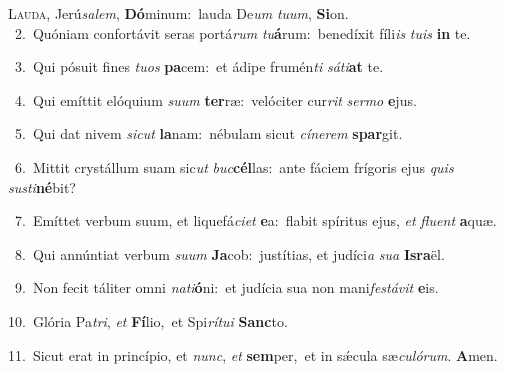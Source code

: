 \lettrine{\initial\textcolor{\initialcolor}{L}}{auda,} Jerú\-\textit{sa}\-\textit{lem}, \textbf{Dó}\-minum:~\star lauda De\textit{um} \textit{tu}\-\textit{um}, \textbf{Si}\-on.\\
{\numbfont\textcolor{\numbcolor}{~2.}}~Quóniam confortávit seras portá\textit{rum} \textit{tu}\-\textbf{á}rum:~\star benedíxit fíli\textit{is} \textit{tu}\-\textit{is} \textbf{in} te.\par
{\numbfont\textcolor{\numbcolor}{~3.}}~Qui pósuit fines \textit{tu}\-\textit{os} \textbf{pa}\-cem:~\star et ádipe frumén\textit{ti} \textit{sá}\-\textit{ti}\textbf{at} te.\par
{\numbfont\textcolor{\numbcolor}{~4.}}~Qui emíttit elóquium \textit{su}\-\textit{um} \textbf{ter}\-ræ:~\star velóciter cur\textit{rit} \textit{ser}\-\textit{mo} \textbf{e}\-jus.\par
{\numbfont\textcolor{\numbcolor}{~5.}}~Qui dat nivem \textit{sic}\-\textit{ut} \textbf{la}\-nam:~\star nébulam sicut \textit{cí}\-\textit{ne}\textit{rem} \textbf{spar}\-git.\par
{\numbfont\textcolor{\numbcolor}{~6.}}~Mittit crystállum suam sic\textit{ut} \textit{buc}\-\textbf{cél}las:~\star ante fáciem frígoris ejus \textit{quis} \textit{sus}\-\textit{ti}\textbf{né}bit?\par
{\numbfont\textcolor{\numbcolor}{~7.}}~Emíttet verbum suum, et liquefá\-\textit{ci}\-\textit{et} \textbf{e}\-a:~\star flabit spíritus ejus, \textit{et} \textit{flu}\-\textit{ent} \textbf{a}\-quæ.\par
{\numbfont\textcolor{\numbcolor}{~8.}}~Qui annúntiat verbum \textit{su}\-\textit{um} \textbf{Ja}\-cob:~\star justítias, et judíci\textit{a} \textit{su}\-\textit{a} \textbf{Is}\-\textbf{ra}ël.\par
{\numbfont\textcolor{\numbcolor}{~9.}}~Non fecit táliter omni \textit{na}\-\textit{ti}\textbf{ó}ni:~\star et judícia sua non mani\-\textit{fes}\-\textit{tá}\textit{vit} \textbf{e}\-is.\par
{\numbfont\textcolor{\numbcolor}{10.}}~Glória Pa\-\textit{tri}\-, \textit{et} \textbf{Fí}\-lio,~\star et Spi\-\textit{rí}\-\textit{tu}\textit{i} \textbf{Sanc}\-to.\par
{\numbfont\textcolor{\numbcolor}{11.}}~Sicut erat in princípio, et \textit{nunc}\-, \textit{et} \textbf{sem}\-per,~\star et in sǽcula sæ\-\textit{cu}\-\textit{ló}\textit{rum}. \textbf{A}\-men.\par
